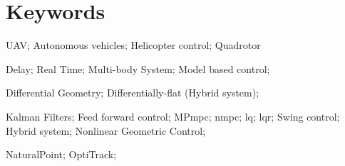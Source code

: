 \chapter*{Keywords}

UAV; Autonomous vehicles; Helicopter control; Quadrotor

Delay; Real Time; Multi-body System;  Model based control;

Differential Geometry; Differentially-flat (Hybrid system);

Kalman Filters; Feed forward control; MP\ac{mpc}; \ac{nmpc}; \ac{lq}; \ac{lqr}; Swing control; Hybrid system; Nonlinear Geometric Control;

NaturalPoint; OptiTrack; 
